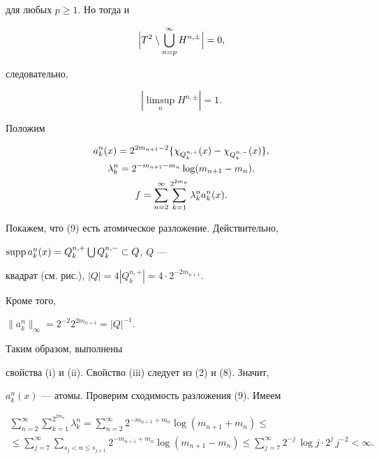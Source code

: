 для любых $p\ge 1$. Но тогда и


$$


\Bigl| T^2\setminus \bigcup^\infty_{n=p}H^{n,\pm}\Bigr|=0,


$$


следовательно,


\begin{equation}


|\underset{n}{\limsup}{}H^{n,\pm}|=1.


\end{equation}


Положим


\begin{gather}


a^n_k(x)=2^{2m_{n+1}-2}\{\chi_{Q^{n,+}_k}(x)-


\chi_{Q^{n,-}_k}(x)\},\\


\lambda^n_k=2^{-m_{n+1}-m_n}\log(m_{n+1}-m_n),\notag \\


f=\sum^\infty_{n=2}\sum^{2^{2m_n}}_{k=1}\lambda^n_k a^n_k(x).


\end{gather}





Покажем, что (9) есть атомическое разложение. Действительно,


$\operatorname{supp} a^n_k(x)=Q^{n,+}_k\bigcup Q^{n,-}_k\subset Q$, $Q$ ---


квадрат (см. рис.), $|Q|=4|Q^{n,+}_k|=4\cdot 2^{-2m_{n+1}}$.


Кроме того,


$\|a^n_k\|_\infty=2^{-2}2^{2m_{n+1}}=|Q|^{-1}$.


Таким образом, выполнены


свойства (i) и (ii). Свойство (iii) следует из (2) и (8). Значит,


$a^n_k(x)$ --- атомы. Проверим сходимость разложения (9). Имеем


\begin{multline*}


\sum^\infty_{n=2}\sum^{2^{2m_n}}_{k=1}\lambda^n_k=


\sum^\infty_{n=2}2^{-m_{n+1}+m_n}\log(m_{n+1}+m_n)\le \\


\le \sum^\infty_{j=7}\sum_{s_j<n\le s_{j+1}}


2^{-m_{n+1}+m_n}\log(m_{n+1}-m_n)\le\sum^\infty_{j=7}


2^{-j}\,\log j\cdot 2^j\,j^{-2}<\infty.


\end{multline*}


